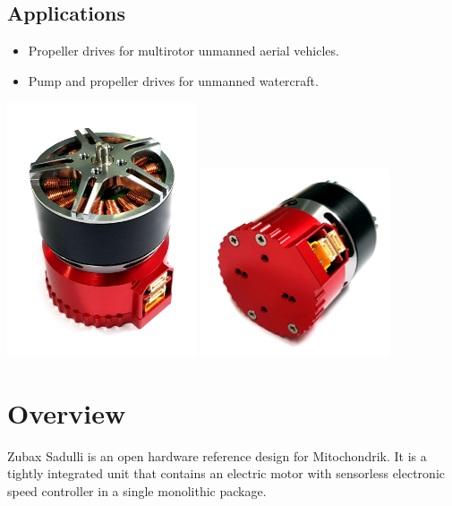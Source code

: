 \documentclass{zubaxdoc}
\begin{document}
\begin{titlepage}
\section*{Applications}

\begin{itemize}
    \item Propeller drives for multirotor unmanned aerial vehicles.
    \item Pump and propeller drives for unmanned watercraft.
\end{itemize}
\centering
\includegraphics[width=0.42\textwidth]{sadulli-top}
\includegraphics[width=0.42\textwidth]{sadulli-bottom}
\end{titlepage}

\tableofcontents
\BeginRightColumn
\listoffigures
\listoftables

\mainmatter

\chapter{Overview}
Zubax Sadulli is an open hardware reference design for Mitochondrik. It is a tightly integrated unit that contains an electric motor with sensorless electronic speed controller in a single monolithic package. 
\end{document}
